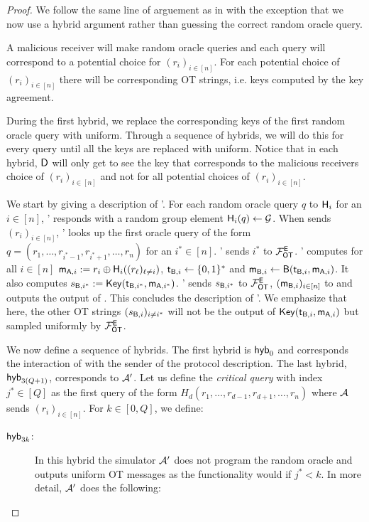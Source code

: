 \begin{proof}
We follow the same line of arguement as in  with the exception that we now use a hybrid argument rather than guessing the correct random oracle query. 

A malicious receiver will make random oracle queries and each query will correspond to a potential choice for $(r_i)_{i\in[n]}$. For each potential choice of $(r_i)_{i\in[n]}$ there will be corresponding OT strings, i.e. keys computed by the key agreement.
 
During the first hybrid, we replace the corresponding keys of the first random oracle query with uniform. Through a sequence of hybrids, we will do this for every query until all the keys are replaced with uniform. Notice that in each hybrid, $\mathsf D$ will only get to see the key that corresponds to the malicious receivers choice of $(r_i)_{i\in[n]}$ and not for all potential choices of $(r_i)_{i\in[n]}$.


We start by giving a description of \Adv'. For each random oracle query $q$ to $\mathsf{H}_i$ for an $i\in[n]$, \Adv' responds with a random group element $\mathsf{H}_i(q)\leftarrow\mathcal{G}$.
 When \Adv sends $(r_i)_{i\in[n]}$, \Adv' looks up the first oracle query of the form $q= (r_1,\dots, r_{i^*-1},r_{i^*+1},\dots, r_{n})$ for an $i^*\in[n]$. \Adv' sends $i^*$ to $\mathcal{F}_{\mathsf{OT}}^\mathsf{E}$. \Adv' computes for all $i\in[n]$ $\mathsf{m}_{\mathsf{A},i}:=r_i\oplus\mathsf{H}_i((r_\ell)_{\ell\neq i})$, $\mathsf{t}_{\mathsf{B},i}\leftarrow\{0,1\}^*$ and $\mathsf{m}_{\mathsf{B},i}\leftarrow\mathsf{B}(\mathsf{t}_{\mathsf{B},i},\mathsf{m}_{\mathsf{A},i})$. It also computes $s_{\mathsf{B},i^*}:=\mathsf{Key}(\mathsf{t}_{\mathsf{B},i^*},\mathsf{m}_{\mathsf{A},i^*})$.
\Adv' sends $s_{\mathsf{B},i^*}$ to $\mathcal{F}_{\mathsf{OT}}^\mathsf{E}$, $(\mathsf{m}_{\mathsf{B},i})_{i\in[n]}$ to \Adv and outputs the output of \Adv. This concludes the description of \Adv'. We emphasize that here, the other OT strings $(s_{\mathsf{B},i})_{i\neq i^*}$ will not be the output of $\mathsf{Key}(\mathsf{t}_{\mathsf{B},i},\mathsf{m}_{\mathsf{A},i})$ but sampled uniformly by $\mathcal{F}_{\mathsf{OT}}^\mathsf{E}$.

We now define a sequence of hybrids. The first hybrid is $\mathsf{hyb}_0$ and corresponds the interaction of \Adv with the sender of the protocol description. The last hybrid, $\mathsf{hyb}_{3(Q+1)}$, corresponds to $\mathcal{A}'$. Let us define the \emph{critical query} with index $j^*\in[Q]$ as the first query of the form $H_d(r_1,\dots, r_{d-1},r_{d+1},\dots, r_{n})$ where $\mathcal{A}$ sends $(r_i)_{i\in[n]}$. 
For $k\in[0,Q]$, we define:
\begin{description}
\item[$\mathsf{hyb}_{3k}$:] In this hybrid the simulator $\mathcal{A}'$ does not program the random oracle and outputs uniform OT messages as the functionality would if $j^*<k$. In more detail,  $\mathcal{A}'$ does the following:


\end{description}
\end{proof}
